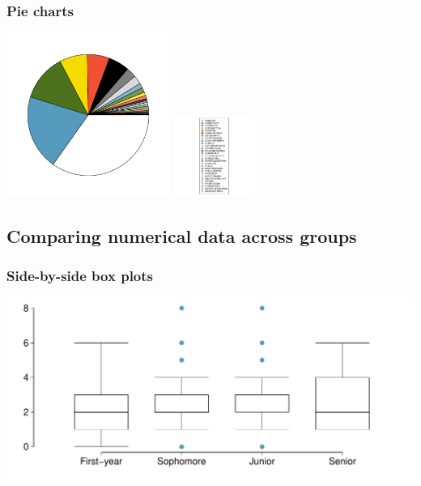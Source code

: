 \begin{frame}
\frametitle{Pie charts}


\vspace{-0.5cm}

\begin{center}
\includegraphics[width=0.4\textwidth]{1-7_categorical_data/figures/mammal_pie_chart/mammal_pie_chart}
\includegraphics[width=0.2\textwidth]{1-7_categorical_data/figures/mammal_pie_chart/mammal_pie_chart_legend}
\end{center}


\end{frame}



\subsection{Comparing numerical data across groups}


\begin{frame}
\frametitle{Side-by-side box plots}


\begin{center}
\includegraphics[width=\textwidth]{1-7_categorical_data/figures/year_clubs/year_clubs}
\end{center}

\end{frame}


